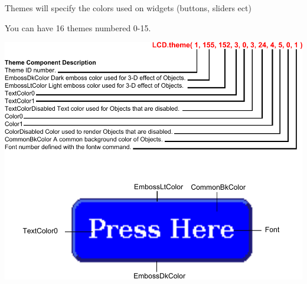 Themes will specify the colors used on widgets (buttons, sliders ect)\par
 You can have 16 themes numbered 0-\/15. \par
  
\begin{DoxyImageNoCaption}
  \mbox{\includegraphics{themes}}
\end{DoxyImageNoCaption}
 